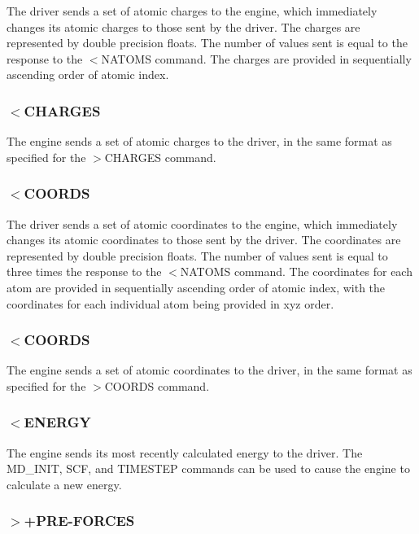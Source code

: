 The driver sends a set of atomic charges to the engine, which immediately changes its atomic charges to those sent by the driver. The charges are represented by double precision floats. The number of values sent is equal to the response to the $<$N\-A\-T\-O\-M\-S command. The charges are provided in sequentially ascending order of atomic index.\hypertarget{index_recv_charges}{}\subsubsection{$<$\-C\-H\-A\-R\-G\-E\-S}\label{index_recv_charges}
The engine sends a set of atomic charges to the driver, in the same format as specified for the {\ttfamily $>$C\-H\-A\-R\-G\-E\-S} command.\hypertarget{index_send_coords}{}\subsubsection{$<$\-C\-O\-O\-R\-D\-S}\label{index_send_coords}
The driver sends a set of atomic coordinates to the engine, which immediately changes its atomic coordinates to those sent by the driver. The coordinates are represented by double precision floats. The number of values sent is equal to three times the response to the $<$N\-A\-T\-O\-M\-S command. The coordinates for each atom are provided in sequentially ascending order of atomic index, with the coordinates for each individual atom being provided in xyz order.\hypertarget{index_send_coords}{}\subsubsection{$<$\-C\-O\-O\-R\-D\-S}\label{index_send_coords}
The engine sends a set of atomic coordinates to the driver, in the same format as specified for the {\ttfamily $>$C\-O\-O\-R\-D\-S} command.\hypertarget{index_recv_energy}{}\subsubsection{$<$\-E\-N\-E\-R\-G\-Y}\label{index_recv_energy}
The engine sends its most recently calculated energy to the driver. The {\ttfamily M\-D\-\_\-\-I\-N\-I\-T}, {\ttfamily S\-C\-F}, and {\ttfamily T\-I\-M\-E\-S\-T\-E\-P} commands can be used to cause the engine to calculate a new energy.\hypertarget{index_send_forces}{}\subsubsection{$>$+\-P\-R\-E-\/\-F\-O\-R\-C\-E\-S}\label{index_send_forces}
